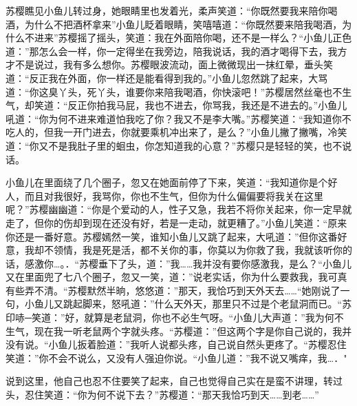 \documentclass[12pt,oneside]{book}
\begin{document}
苏樱瞧见小鱼儿转过身，她眼睛里也发着光，柔声笑道：``你既然要我来陪你喝酒，为什么不把酒杯拿来''小鱼儿眨着眼睛，笑嘻嘻道：``你既然要来陪我喝酒，为什么不进来''苏樱摇了摇头，笑道：我在外面陪你喝，还不是一样么？``小鱼儿正色道：''那怎么会一样，你一定得坐在我旁边，陪我说话，我的酒才喝得下去，我方才不是说过，我有多么想你。苏樱眼波流动，面上微微现出一抹红晕，垂头笑道：``反正我在外面，你一样还是能看得到我的。''小鱼儿忽然跳了起来，大骂道：``你这臭丫头，死丫头，谁要你来陪我喝酒，你快滚吧！''苏樱居然丝毫也不生气，却笑道：``反正你拍我马屁，我也不进去，你骂我，我还是不进去的。''小鱼儿吼道：``你为何不进来难道怕我吃了你？我又不是李大嘴。''苏樱笑道：``我知道你不吃人的，但我一开门进去，你就要乘机冲出来了，是么？''小鱼儿撇了撇嘴，冷笑道：``你又不是我肚子里的蛔虫，你怎知道我的心意？''苏樱只是轻轻的笑，也不说话。

小鱼儿在里面绕了几个圈子，忽又在她面前停了下来，笑道：``我知道你是个好人，而且对我很好，我骂你，你也不生气，但你为什么偏偏要将我关在这里呢？''苏樱幽幽道：``你是个爱动的人，性子又急，我若不将你关起来，你一定早就走了，但你的伤却到现在还没有好，若是一走动，就更糟了。''小鱼儿笑道：``原来你还是一番好意。苏樱嫣然一笑，谁知小鱼儿又跳了起来，大吼道：''但你这番好意，我却不领情，我是死是活，都不关你的事，你莫以为你救了我，我就该听你的话，感激你\ldots。．``苏樱垂下了头，道：''我\ldots\ldots 我并没有要你感激我，是么？``小鱼儿又在里面兜了七八个圈子，忽又一笑，道：''说老实话，你为什么要救我，我可真有些弄不清。``苏樱默然半晌，悠悠道：''那天，我恰巧到天外天去\ldots\ldots{}``她刚说了一句，小鱼儿又跳起脚来，怒吼道：''什么天外天，那里只不过是个老鼠洞而已。``苏印哧─笑道：''好，就算是老鼠洞，你也不必生气呀。``小鱼儿大声道：''我为何不生气，现在我一听老鼠两个字就头疼。``苏樱道：''但这两个字是你自己说的，我并没有说。``小鱼儿扳着脸道：''我听人说都头疼，自己说自然头更疼了。``苏樱忍住笑道：''你不会不说么，又没有人强迫你说。``小鱼儿道：''我不说又嘴痒，我\ldots．"

说到这里，他自己也忍不住要笑了起来，自己也觉得自己实在是蛮不讲理，转过头，忍住笑道：``你为何不说下去？''苏樱道：``那天我恰巧到天\ldots\ldots 到老\ldots\ldots{}''
\end{document}
